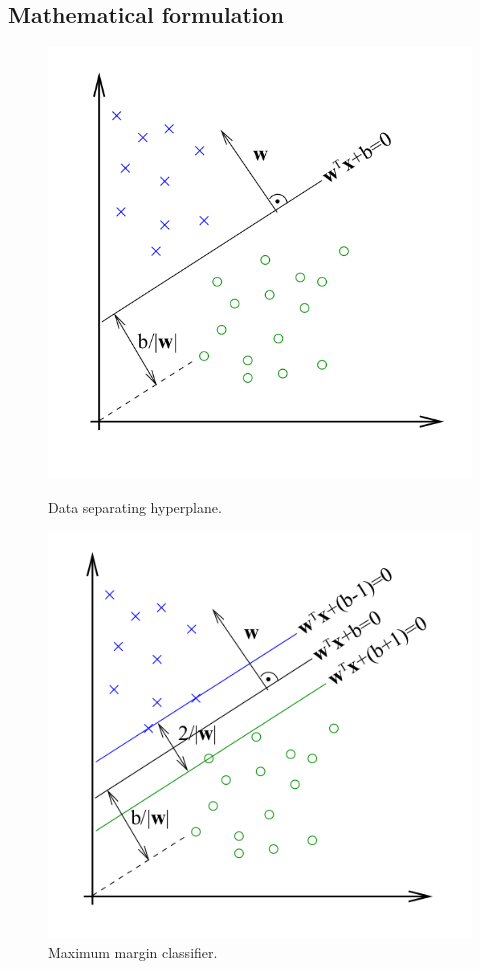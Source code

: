 \subsection{Mathematical formulation}
\begin{figure}
\centering
\begin{minipage}{.5\textwidth}
  \centering
  \includegraphics[width=.95\textwidth]{figures/SVMFigure1.png}
  \caption{Data separating hyperplane.}
  \label{fig:SVM1}
\end{minipage}%
\begin{minipage}{.5\textwidth}
  \centering
  \includegraphics[width=.95\textwidth]{figures/SVMFigure2.png}
  \caption{Maximum margin classifier.}
  \label{fig:SVM2}
\end{minipage}
\end{figure}

